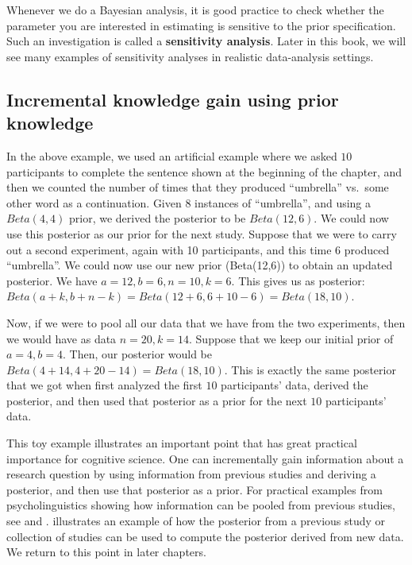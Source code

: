 \documentclass[12pt,]{krantz}
\theoremstyle{definition}
\theoremstyle{definition}
\theoremstyle{definition}
\theoremstyle{remark}
\begin{document}
Whenever we do a Bayesian analysis, it is good practice to check whether
the parameter you are interested in estimating is sensitive to the prior
specification. Such an investigation is called a \textbf{sensitivity
analysis}. Later in this book, we will see many examples of sensitivity
analyses in realistic data-analysis settings.

\subsection{Incremental knowledge gain using prior
knowledge}\label{incremental-knowledge-gain-using-prior-knowledge}

In the above example, we used an artificial example where we asked
\(10\) participants to complete the sentence shown at the beginning of
the chapter, and then we counted the number of times that they produced
``umbrella'' vs.~some other word as a continuation. Given 8 instances of
``umbrella'', and using a \(Beta(4,4)\) prior, we derived the posterior
to be \(Beta(12,6)\). We could now use this posterior as our prior for
the next study. Suppose that we were to carry out a second experiment,
again with 10 participants, and this time \(6\) produced ``umbrella''.
We could now use our new prior (Beta(12,6)) to obtain an updated
posterior. We have \(a=12, b=6, n=10, k=6\). This gives us as posterior:
\(Beta(a+k,b+n-k) = Beta(12+6,6+10-6)=Beta(18,10)\).

Now, if we were to pool all our data that we have from the two
experiments, then we would have as data \(n=20, k=14\). Suppose that we
keep our initial prior of \(a=4,b=4\). Then, our posterior would be
\(Beta(4+14,4+20-14)=Beta(18,10)\). This is exactly the same posterior
that we got when first analyzed the first \(10\) participants' data,
derived the posterior, and then used that posterior as a prior for the
next \(10\) participants' data.

This toy example illustrates an important point that has great practical
importance for cognitive science. One can incrementally gain information
about a research question by using information from previous studies and
deriving a posterior, and then use that posterior as a prior. For
practical examples from psycholinguistics showing how information can be
pooled from previous studies, see \citet{JaegerEngelmannVasishth2017}
and \citet{NicenboimRoettgeretal}. \citet{VasishthEngelmann2020}
illustrates an example of how the posterior from a previous study or
collection of studies can be used to compute the posterior derived from
new data. We return to this point in later chapters.
\end{document}
